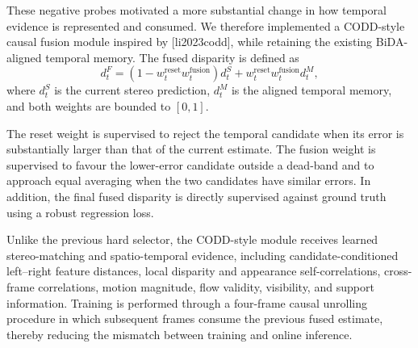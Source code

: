 \documentclass[11pt,a4paper]{article}
\providecommand{\citet}[1]{[#1]}
\begin{document}
These negative probes motivated a more substantial change in how temporal evidence is
represented and consumed. We therefore implemented a CODD-style causal fusion module
inspired by \citet{li2023codd}, while retaining the existing BiDA-aligned temporal memory.
The fused disparity is defined as
\begin{equation}
    d_t^{F}
    =
    \left(
        1 -
        w_t^{\mathrm{reset}}
        w_t^{\mathrm{fusion}}
    \right)
    d_t^{S}
    +
    w_t^{\mathrm{reset}}
    w_t^{\mathrm{fusion}}
    d_t^{M},
    \label{eq:codd_style_fusion}
\end{equation}
where \(d_t^{S}\) is the current stereo prediction, \(d_t^{M}\) is the aligned temporal
memory, and both weights are bounded to \([0,1]\).

The reset weight is supervised to reject the temporal candidate when its error is
substantially larger than that of the current estimate. The fusion weight is supervised
to favour the lower-error candidate outside a dead-band and to approach equal averaging
when the two candidates have similar errors. In addition, the final fused disparity is
directly supervised against ground truth using a robust regression loss.

Unlike the previous hard selector, the CODD-style module receives learned stereo-matching
and spatio-temporal evidence, including candidate-conditioned left--right feature
distances, local disparity and appearance self-correlations, cross-frame correlations,
motion magnitude, flow validity, visibility, and support information. Training is
performed through a four-frame causal unrolling procedure in which subsequent frames
consume the previous fused estimate, thereby reducing the mismatch between training and
online inference.
\end{document}
